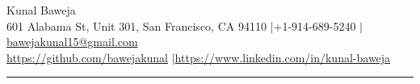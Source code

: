 \documentclass{article}
\def\name{Kunal Baweja}
\begin{document}
\begin{center}
{\huge \name}\\
601 Alabama St, Unit 301, San Francisco, CA 94110 $|$\hspace{3pt}+1-914-689-5240 $|$\hspace{3pt}\href{mailto:bawejakunal15@gmail.com}{bawejakunal15@gmail.com}\\
\vspace{2pt}
\href{https://github.com/bawejakunal}{https://github.com/bawejakunal} $|$\hspace{3pt}\href{https://www.linkedin.com/in/kunal-baweja}{https://www.linkedin.com/in/kunal-baweja}
\end{center}

\hrule
\vspace{5pt}
\end{document}
